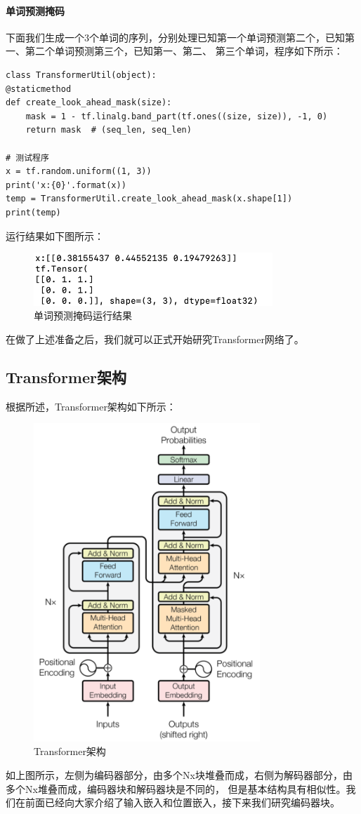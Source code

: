 \documentclass{article}
\begin{document}
\paragraph{单词预测掩码}
下面我们生成一个3个单词的序列，分别处理已知第一个单词预测第二个，已知第一、第二个单词预测第三个，已知第一、第二、
第三个单词，程序如下所示：
\begin{lstlisting}
class TransformerUtil(object):
@staticmethod
def create_look_ahead_mask(size):
    mask = 1 - tf.linalg.band_part(tf.ones((size, size)), -1, 0)
    return mask  # (seq_len, seq_len)

# 测试程序
x = tf.random.uniform((1, 3))
print('x:{0}'.format(x))
temp = TransformerUtil.create_look_ahead_mask(x.shape[1])
print(temp)
\end{lstlisting}
运行结果如下图所示：
\begin{figure}[H]
    \caption{单词预测掩码运行结果}
    \label{f000078}
    \centering
    \includegraphics[height=2cm]{images/f000078}
\end{figure}
在做了上述准备之后，我们就可以正式开始研究Transformer网络了。

\subsection{Transformer架构}
根据\cite{r000006}所述，Transformer架构如下所示：
\begin{figure}[H]
    \caption{Transformer架构}
    \label{f000079}
    \centering
    \includegraphics[height=12cm]{images/f000079}
\end{figure}
如上图所示，左侧为编码器部分，由多个Nx块堆叠而成，右侧为解码器部分，由多个Nx堆叠而成，编码器块和解码器块是不同的，
但是基本结构具有相似性。我们在前面已经向大家介绍了输入嵌入和位置嵌入，接下来我们研究编码器块。
\end{document}

